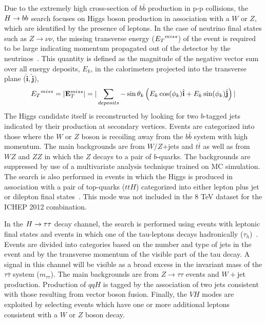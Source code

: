 Due to the extremely high cross-section of $b\bar{b}$ production in 
p-p collisions, the $H\rightarrow bb$ search focuses on Higgs boson production in association
with a $W$ or $Z$, which are identified by the presence of leptons. In the case 
of neutrino final states such as $Z\rightarrow \nu\nu$, the missing transverse energy 
(${E_{T}}^{miss}$) of the event is required to be large indicating momentum propagated out of the detector by the neutrinos~\citep{HIG-12-019}. 
This quantity is defined as the magnitude of the negative vector sum over all energy deposits, 
$E_{k}$, in the calorimeters projected into the transverse plane 
 ($\hat{\mathbf{i}},\hat{\mathbf{j}}$),
\begin{equation}
{E_{T}}^{miss} = |{\mathbf{E}^{miss}_{T}}| =|\sum_{deposits} -\sin\theta_{k}\left(E_{k}\cos(\phi_{k})\hat{\mathbf{i}}+E_{k}\sin(\phi_{k})\hat{\mathbf{j}}\right)|
\end{equation}
The Higgs candidate itself is reconstructed by looking for two 
$b$-tagged jets indicated by their production at secondary vertices. Events are 
categorized into those where the 
$W$ or $Z$ boson is recoiling away from the $b\bar{b}$ system with high momentum.
The main backgrounds are from $W/Z$+jets and $t\bar{t}$ as well as from $WZ$ and $ZZ$
in which the $Z$ decays to a pair of $b$-quarks. The backgrounds are suppressed
by use of a multivariate analysis technique trained on MC simulation.
The search is also performed in events in which the Higgs is produced in association
with a pair of top-quarks ($ttH$) categorized into either lepton plus jet or dilepton 
final states~\citep{HIG-12-019}. This mode was not included in the 8 TeV dataset
for the ICHEP 2012 combination.

In the $H\rightarrow\tau\tau$ decay channel, the search is performed using events with leptonic
final states and events in which one of the tau-leptons decays hadronically 
($\tau_{h}$)~\citep{HIG-12-018}.
Events are divided into categories based on the number and type of jets in the event
and by the transverse momentum of the visible part of the tau decay.
A signal in this channel will be visible as a broad excess in the invariant mass
of the $\tau\bar{\tau}$ system ($m_{\tau\tau}$). The main backgrounds are from
$Z\rightarrow\tau\tau$ events and $W+$jet production. 
Production of $qqH$ is tagged by the association of two jets consistent with 
those resulting from vector boson fusion. Finally, the $VH$ modes are
exploited by selecting events which have one or more additional leptons 
consistent with a $W$ or $Z$ boson decay.


